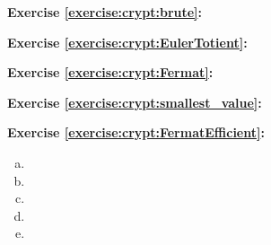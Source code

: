 \noindent\textbf{Exercise \ref{exercise:crypt:brute}:}

\noindent\textbf{Exercise \ref{exercise:crypt:EulerTotient}:}

\noindent\textbf{Exercise \ref{exercise:crypt:Fermat}:}

\noindent\textbf{Exercise \ref{exercise:crypt:smallest_value}:}

\noindent\textbf{Exercise \ref{exercise:crypt:FermatEfficient}:}
\begin{enumerate}[(a)]
\item
\item
\item
\item
\item
\end{enumerate}

